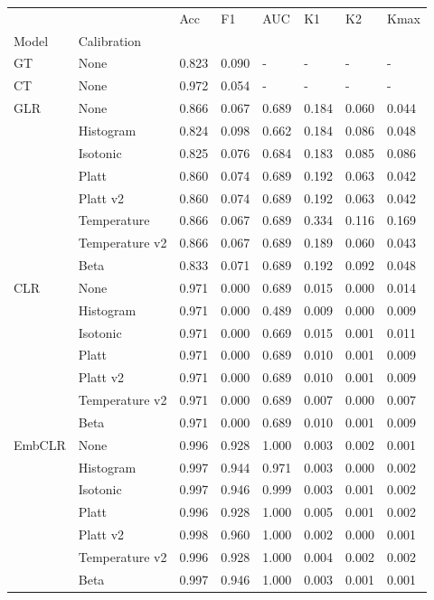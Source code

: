 \begin{tabular}{llllllll}
\toprule
 &  & Acc & F1 & AUC & K1 & K2 & Kmax \\
Model & Calibration &  &  &  &  &  &  \\
\midrule
GT & None & 0.823 & 0.090 & - & - & - & - \\
\cline{1-8}
CT & None & 0.972 & 0.054 & - & - & - & - \\
\cline{1-8}
\multirow[t]{8}{*}{GLR} & None & 0.866 & 0.067 & 0.689 & 0.184 & 0.060 & 0.044 \\
 & Histogram & 0.824 & 0.098 & 0.662 & 0.184 & 0.086 & 0.048 \\
 & Isotonic & 0.825 & 0.076 & 0.684 & 0.183 & 0.085 & 0.086 \\
 & Platt & 0.860 & 0.074 & 0.689 & 0.192 & 0.063 & 0.042 \\
 & Platt v2 & 0.860 & 0.074 & 0.689 & 0.192 & 0.063 & 0.042 \\
 & Temperature & 0.866 & 0.067 & 0.689 & 0.334 & 0.116 & 0.169 \\
 & Temperature v2 & 0.866 & 0.067 & 0.689 & 0.189 & 0.060 & 0.043 \\
 & Beta & 0.833 & 0.071 & 0.689 & 0.192 & 0.092 & 0.048 \\
\cline{1-8}
\multirow[t]{7}{*}{CLR} & None & 0.971 & 0.000 & 0.689 & 0.015 & 0.000 & 0.014 \\
 & Histogram & 0.971 & 0.000 & 0.489 & 0.009 & 0.000 & 0.009 \\
 & Isotonic & 0.971 & 0.000 & 0.669 & 0.015 & 0.001 & 0.011 \\
 & Platt & 0.971 & 0.000 & 0.689 & 0.010 & 0.001 & 0.009 \\
 & Platt v2 & 0.971 & 0.000 & 0.689 & 0.010 & 0.001 & 0.009 \\
 & Temperature v2 & 0.971 & 0.000 & 0.689 & 0.007 & 0.000 & 0.007 \\
 & Beta & 0.971 & 0.000 & 0.689 & 0.010 & 0.001 & 0.009 \\
\cline{1-8}
\multirow[t]{7}{*}{EmbCLR} & None & 0.996 & 0.928 & 1.000 & 0.003 & 0.002 & 0.001 \\
 & Histogram & 0.997 & 0.944 & 0.971 & 0.003 & 0.000 & 0.002 \\
 & Isotonic & 0.997 & 0.946 & 0.999 & 0.003 & 0.001 & 0.002 \\
 & Platt & 0.996 & 0.928 & 1.000 & 0.005 & 0.001 & 0.002 \\
 & Platt v2 & 0.998 & 0.960 & 1.000 & 0.002 & 0.000 & 0.001 \\
 & Temperature v2 & 0.996 & 0.928 & 1.000 & 0.004 & 0.002 & 0.002 \\
 & Beta & 0.997 & 0.946 & 1.000 & 0.003 & 0.001 & 0.001 \\
\cline{1-8}
\bottomrule
\end{tabular}

